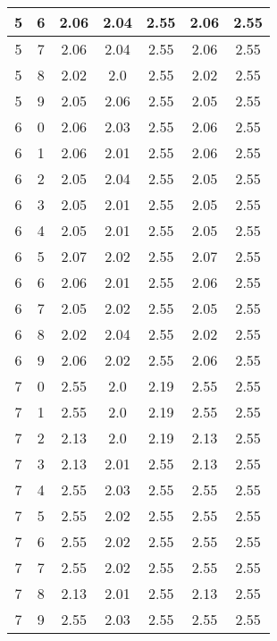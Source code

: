 \begin{longtable}{|c|c||c||c|c||c|c|}
	5 & 6 & 2.06 & 2.04 & 2.55 & 2.06 & 2.55 \\ \hline
	5 & 7 & 2.06 & 2.04 & 2.55 & 2.06 & 2.55 \\ \hline
	5 & 8 & 2.02 & 2.0 & 2.55 & 2.02 & 2.55 \\ \hline
	5 & 9 & 2.05 & 2.06 & 2.55 & 2.05 & 2.55 \\ \hline
	6 & 0 & 2.06 & 2.03 & 2.55 & 2.06 & 2.55 \\ \hline
	6 & 1 & 2.06 & 2.01 & 2.55 & 2.06 & 2.55 \\ \hline
	6 & 2 & 2.05 & 2.04 & 2.55 & 2.05 & 2.55 \\ \hline
	6 & 3 & 2.05 & 2.01 & 2.55 & 2.05 & 2.55 \\ \hline
	6 & 4 & 2.05 & 2.01 & 2.55 & 2.05 & 2.55 \\ \hline
	6 & 5 & 2.07 & 2.02 & 2.55 & 2.07 & 2.55 \\ \hline
	6 & 6 & 2.06 & 2.01 & 2.55 & 2.06 & 2.55 \\ \hline
	6 & 7 & 2.05 & 2.02 & 2.55 & 2.05 & 2.55 \\ \hline
	6 & 8 & 2.02 & 2.04 & 2.55 & 2.02 & 2.55 \\ \hline
	6 & 9 & 2.06 & 2.02 & 2.55 & 2.06 & 2.55 \\ \hline
	7 & 0 & 2.55 & 2.0 & 2.19 & 2.55 & 2.55 \\ \hline
	7 & 1 & 2.55 & 2.0 & 2.19 & 2.55 & 2.55 \\ \hline
	7 & 2 & 2.13 & 2.0 & 2.19 & 2.13 & 2.55 \\ \hline
	7 & 3 & 2.13 & 2.01 & 2.55 & 2.13 & 2.55 \\ \hline
	7 & 4 & 2.55 & 2.03 & 2.55 & 2.55 & 2.55 \\ \hline
	7 & 5 & 2.55 & 2.02 & 2.55 & 2.55 & 2.55 \\ \hline
	7 & 6 & 2.55 & 2.02 & 2.55 & 2.55 & 2.55 \\ \hline
	7 & 7 & 2.55 & 2.02 & 2.55 & 2.55 & 2.55 \\ \hline
	7 & 8 & 2.13 & 2.01 & 2.55 & 2.13 & 2.55 \\ \hline
	7 & 9 & 2.55 & 2.03 & 2.55 & 2.55 & 2.55 \\ \hline
\end{longtable}
\clearpage{}
